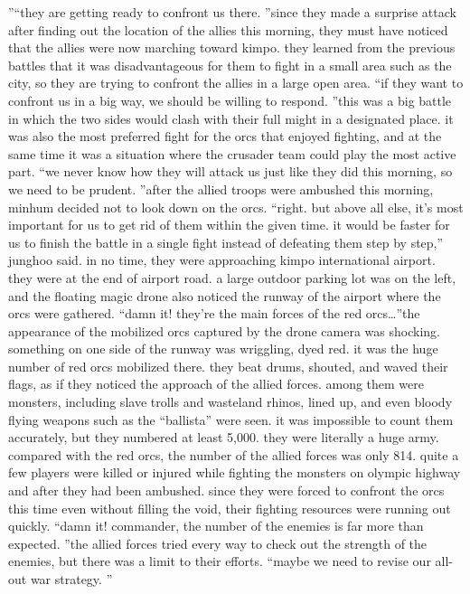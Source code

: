 ”“they are getting ready to confront us there.
”since they made a surprise attack after finding out the location of the allies this morning, they must have noticed that the allies were now marching toward kimpo.
they learned from the previous battles that it was disadvantageous for them to fight in a small area such as the city, so they are trying to confront the allies in a large open area.
“if they want to confront us in a big way, we should be willing to respond.
”this was a big battle in which the two sides would clash with their full might in a designated place.
 it was also the most preferred fight for the orcs that enjoyed fighting, and at the same time it was a situation where the crusader team could play the most active part.
“we never know how they will attack us just like they did this morning, so we need to be prudent.
”after the allied troops were ambushed this morning, minhum decided not to look down on the orcs.
“right.
 but above all else, it’s most important for us to get rid of them within the given time.
 it would be faster for us to finish the battle in a single fight instead of defeating them step by step,” junghoo said.
in no time, they were approaching kimpo international airport.
 they were at the end of airport road.
 a large outdoor parking lot was on the left, and the floating magic drone also noticed the runway of the airport where the orcs were gathered.
“damn it! they’re the main forces of the red orcs…”the appearance of the mobilized orcs captured by the drone camera was shocking.
something on one side of the runway was wriggling, dyed red.
 it was the huge number of red orcs mobilized there.
 they beat drums, shouted, and waved their flags, as if they noticed the approach of the allied forces.
among them were monsters, including slave trolls and wasteland rhinos, lined up, and even bloody flying weapons such as the “ballista” were seen.
 it was impossible to count them accurately, but they numbered at least 5,000.
 they were literally a huge army.
compared with the red orcs, the number of the allied forces was only 814.
quite a few players were killed or injured while fighting the monsters on olympic highway and after they had been ambushed.
since they were forced to confront the orcs this time even without filling the void, their fighting resources were running out quickly.
“damn it! commander, the number of the enemies is far more than expected.
”the allied forces tried every way to check out the strength of the enemies, but there was a limit to their efforts.
“maybe we need to revise our all-out war strategy.
”

